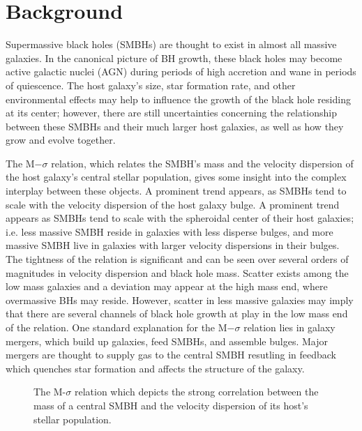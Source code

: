 \documentclass[12pt,headA,chapB]{fiskthesis}
\begin{document}
\section{\normalsize Background}
\thispagestyle{empty}

Supermassive black holes (SMBHs) are thought to exist in almost all massive galaxies. \citep{Kormendy2013} In the canonical picture of BH growth, these black holes may become active galactic nuclei (AGN) during periods of high accretion and wane in periods of quiescence. \citep{Alexander2005,Papovich2006,Volonteri2012} The host galaxy's size, star formation rate, and other environmental effects may help to influence the growth of the black hole residing at its center; however, there are still uncertainties concerning the relationship between these SMBHs and their much larger host galaxies, as well as how they grow and evolve together. \citep[5-8 citations here]{Haehnelt2000,DiMatteo2005,Hopkins2006,Fu2008,Sijacki2009,Silverman2009,Mullaney2012}

The M$-\sigma$ relation, which relates the SMBH's mass and the velocity dispersion of the host galaxy's central stellar population, gives some insight into the complex interplay between these objects. \citep{Ferrarese2000} A prominent trend appears, as SMBHs tend to scale with the velocity dispersion of the host galaxy bulge. A prominent trend appears as SMBHs tend to scale with the spheroidal center of their host galaxies; i.e. less massive SMBH reside in galaxies with less disperse bulges, and more massive SMBH live in galaxies with larger velocity dispersions in their bulges. The tightness of the relation is significant and can be seen over several orders of magnitudes in velocity dispersion and black hole mass. \citep{Merritt2001,Graham2011,Mcconnell2013,Kormendy2013} Scatter exists among the low mass galaxies and a deviation may appear at the high mass end, where overmassive BHs may reside. \citep{VanDenBosch2007,Moster2010,Natarajan2011} However, scatter in less massive galaxies may imply that there are several channels of black hole growth at play in the low mass end of the relation. \citep{Micic2007,Volonteri2009,Reines2013,Graham2014} One standard explanation for the M$-\sigma$ relation lies in galaxy mergers, which build up galaxies, feed SMBHs, and assemble bulges. \citep{DiMatteo2005,Shen2008} Major mergers are thought to supply gas to the central SMBH resutling in feedback which quenches star formation and affects the structure of the galaxy. 

\begin{figure}
\centerline{}
\caption[M-$\sigma$ Relation]{The M-$\sigma$ relation which depicts the strong correlation between the mass of a central SMBH and the velocity dispersion of its host's stellar population. \cite{Xiao2011}}
\label{msigma} 
\end{figure}
\end{document}
